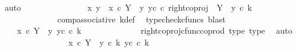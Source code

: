 \begin{isabellebody}
\ auto\isanewline
\ \ \ \ \ \ \ \ \ \ \isamarkupfalse%
\ \isamarkupfalse%
\ {\isachardoublequoteopen}{\isachardot}{\kern0pt}{\isachardot}{\kern0pt}{\isachardot}{\kern0pt}\ {\isacharequal}{\kern0pt}\ {\isacharparenleft}{\kern0pt}{\isacharparenleft}{\kern0pt}{\isasymlangle}x{}{\isacharcomma}{\kern0pt}\ y{}{\isasymrangle}\ {\isasymamalg}\ {\isasymlangle}x{}\ {\isasymcirc}\isactrlsub c\ {\isasymbeta}\isactrlbsub Y\ {\isasymsetminus}\ {\isacharparenleft}{\kern0pt}{\isasymone}{\isacharcomma}{\kern0pt}y{}{\isacharparenright}{\kern0pt}\isactrlesub {\isacharcomma}{\kern0pt}\ y{}\isactrlsup c{\isasymrangle}{\isacharparenright}{\kern0pt}\ {\isasymcirc}\isactrlsub c\ right{\isacharunderscore}{\kern0pt}coproj\ {\isasymone}\ {\isacharparenleft}{\kern0pt}Y\ {\isasymsetminus}\ {\isacharparenleft}{\kern0pt}{\isasymone}{\isacharcomma}{\kern0pt}y{}{\isacharparenright}{\kern0pt}{\isacharparenright}{\kern0pt}{\isacharparenright}{\kern0pt}\ {\isasymcirc}\isactrlsub c\ k{\isachardoublequoteclose}\isanewline
\ \ \ \ \ \ \ \ \ \ \ \ \isamarkupfalse%
\ comp{\isacharunderscore}{\kern0pt}associative{}\ k{\isacharunderscore}{\kern0pt}def\ \isamarkupfalse%
\ {\isacharparenleft}{\kern0pt}typecheck{\isacharunderscore}{\kern0pt}cfuncs{\isacharcomma}{\kern0pt}\ blast{\isacharparenright}{\kern0pt}\isanewline
\ \ \ \ \ \ \ \ \ \ \isamarkupfalse%
\ \isamarkupfalse%
\ {\isachardoublequoteopen}{\isachardot}{\kern0pt}{\isachardot}{\kern0pt}{\isachardot}{\kern0pt}\ {\isacharequal}{\kern0pt}\ \ {\isasymlangle}x{}\ {\isasymcirc}\isactrlsub c\ {\isasymbeta}\isactrlbsub Y\ {\isasymsetminus}\ {\isacharparenleft}{\kern0pt}{\isasymone}{\isacharcomma}{\kern0pt}y{}{\isacharparenright}{\kern0pt}\isactrlesub {\isacharcomma}{\kern0pt}\ y{}\isactrlsup c{\isasymrangle}\ {\isasymcirc}\isactrlsub c\ k{\isachardoublequoteclose}\isanewline
\ \ \ \ \ \ \ \ \ \ \ \ \isamarkupfalse%
\ right{\isacharunderscore}{\kern0pt}coproj{\isacharunderscore}{\kern0pt}cfunc{\isacharunderscore}{\kern0pt}coprod\ type{}\ type{}\ \isamarkupfalse%
\ auto\isanewline
\ \ \ \ \ \ \ \ \ \ \isamarkupfalse%
\ \isamarkupfalse%
\ {\isachardoublequoteopen}{\isachardot}{\kern0pt}{\isachardot}{\kern0pt}{\isachardot}{\kern0pt}\ {\isacharequal}{\kern0pt}\ \ {\isasymlangle}x{}\ {\isasymcirc}\isactrlsub c\ {\isasymbeta}\isactrlbsub Y\ {\isasymsetminus}\ {\isacharparenleft}{\kern0pt}{\isasymone}{\isacharcomma}{\kern0pt}y{}{\isacharparenright}{\kern0pt}\isactrlesub \ {\isasymcirc}\isactrlsub c\ k{\isacharcomma}{\kern0pt}\ y{}\isactrlsup c\ {\isasymcirc}\isactrlsub c\ k\ {\isasymrangle}{\isachardoublequoteclose}\isanewline

\end{isabellebody}
